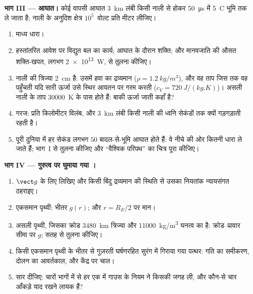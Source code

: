 \begin{problem}[{सप्ताहांत समस्या --- साफ़ मौसम का क्षेत्र, तड़ित-मेघ,
बिजली का आघात, और गुरुत्व पर घुमाया गया गाउस का नियम}]
\medskip
\noindent\textbf{भाग III --- आघात।}
कोई वापसी आघात \qty{3}{km} लंबी किसी नाली से होकर \qty{50}{\micro s} में
\qty{5}{C} भूमि तक ले जाता है; नाली के अनुदिश क्षेत्र
$10^5$~वोल्ट प्रति मीटर लीजिए।
\begin{enumerate}[resume]
  \item माध्य धारा।
  \item हस्तांतरित आवेश पर विद्युत बल का कार्य; आघात के दौरान शक्ति; और
        मानवजाति की औसत शक्ति-खपत, लगभग \qty{2e13}{W}, से तुलना कीजिए।
  \item नाली की त्रिज्या \qty{2}{cm} है: उसमें हवा का द्रव्यमान
        ($\rho = \qty{1.2}{kg/m^3}$), और वह ताप जिस तक वह पहुँचती यदि सारी
        ऊर्जा उसे स्थिर आयतन पर गरम करती ($c_V =
        \qty{720}{J/(kg.K)}$)। असली नाली के ताप \qty{30000}{K} के पास होते
        हैं: बाकी ऊर्जा जाती कहाँ है?
  \item गरज: प्रति किलोमीटर विलंब, और \qty{3}{km} लंबी किसी नाली की ध्वनि
        सेकंडों तक क्यों गड़गड़ाती रहती है।
  \item पूरी दुनिया में हर सेकंड लगभग $50$ बादल-से-भूमि आघात होते हैं: वे
        नीचे की ओर कितनी धारा ले जाते हैं; भाग~I से तुलना कीजिए और
        ``वैश्विक परिपथ'' का चित्र पूरा कीजिए।
\end{enumerate}

\medskip
\noindent\textbf{भाग IV --- गुरुत्व पर घुमाया गया ।}
\begin{enumerate}[resume]
  \item {} $\vect g$ के लिए  लिखिए और किसी
        बिंदु द्रव्यमान की स्थिति से उसका नियतांक न्यायसंगत ठहराइए।
  \item एकसमान पृथ्वी: भीतर $g(r)$; और $r = R_E/2$ पर मान।
  \item असली पृथ्वी, जिसका क्रोड \qty{3480}{km} त्रिज्या और
        \qty{11000}{kg/m^3} घनत्व का है: क्रोड--प्रावार सीमा पर $g$; सतह से
        तुलना कीजिए।
  \item किसी एकसमान पृथ्वी के भीतर से गुज़रती घर्षणरहित सुरंग में गिराया गया
        पत्थर: गति का समीकरण, दोलन का आवर्तकाल, और केंद्र पर चाल।
  \item सार दीजिए: चारों भागों में से हर एक में गाउस के नियम ने किसकी जगह
        ली, और कौन-से चार आँकड़े याद रखने लायक हैं?
\end{enumerate}
\end{problem}
